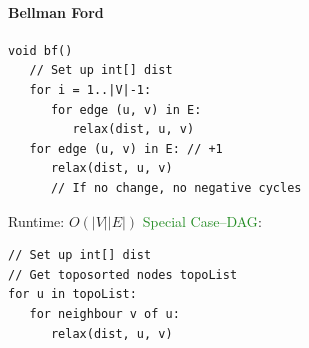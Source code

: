 \paragraph{Bellman Ford}
\begin{verbatim}
void bf()
   // Set up int[] dist
   for i = 1..|V|-1:
      for edge (u, v) in E:
         relax(dist, u, v)
   for edge (u, v) in E: // +1
      relax(dist, u, v)
      // If no change, no negative cycles
\end{verbatim}
\textcolor{Bittersweet}{Runtime}: $O(|V||E|)$
\textcolor{ForestGreen}{Special Case–DAG}:
\begin{verbatim}
// Set up int[] dist
// Get toposorted nodes topoList
for u in topoList:
   for neighbour v of u:
      relax(dist, u, v)
\end{verbatim}

